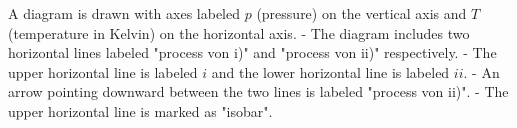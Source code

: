 A diagram is drawn with axes labeled \( p \) (pressure) on the vertical axis and \( T \) (temperature in Kelvin) on the horizontal axis.  
- The diagram includes two horizontal lines labeled "process von i)" and "process von ii)" respectively.  
- The upper horizontal line is labeled \( i \) and the lower horizontal line is labeled \( ii \).  
- An arrow pointing downward between the two lines is labeled "process von ii)".  
- The upper horizontal line is marked as "isobar".